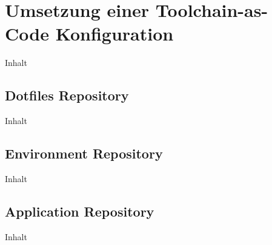 \section{Umsetzung einer Toolchain-as-Code Konfiguration}
\label{sec:06-02_implementation-of-a-toolchain-as-code-configuration}

Inhalt

\subsection{Dotfiles Repository}
\label{subsec:06-02-01_dotfiles-repository}

Inhalt

\subsection{Environment Repository}
\label{subsec:06-02-02_environment-repository}

Inhalt

\subsection{Application Repository}
\label{subsec:06-02-03_application-repository}

Inhalt
